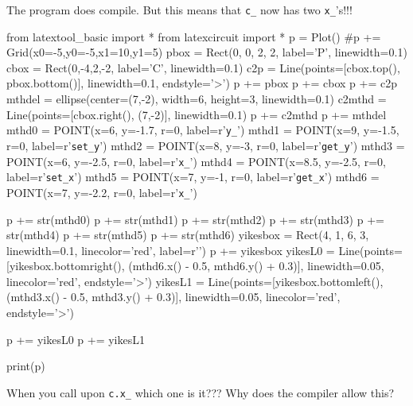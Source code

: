 The program does compile. But this means that \verb!c_! now has two
\verb!x_!'s!!!
\begin{python}
from latextool_basic import *
from latexcircuit import *
p = Plot()
#p += Grid(x0=-5,y0=-5,x1=10,y1=5)
pbox = Rect(0, 0, 2, 2, label='P', linewidth=0.1)
cbox = Rect(0,-4,2,-2, label='C', linewidth=0.1)
c2p = Line(points=[cbox.top(), pbox.bottom()], linewidth=0.1, endstyle='>')
p += pbox
p += cbox
p += c2p
mthdel = ellipse(center=(7,-2), width=6, height=3, linewidth=0.1)
c2mthd = Line(points=[cbox.right(), (7,-2)], linewidth=0.1)
p += c2mthd
p += mthdel
mthd0 = POINT(x=6, y=-1.7, r=0, label=r'\verb!y_!')
mthd1 = POINT(x=9, y=-1.5, r=0, label=r'\verb!set_y!')
mthd2 = POINT(x=8, y=-3, r=0, label=r'\verb!get_y!')
mthd3 = POINT(x=6, y=-2.5, r=0, label=r'\verb!x_!')
mthd4 = POINT(x=8.5, y=-2.5, r=0, label=r'\verb!set_x!')
mthd5 = POINT(x=7, y=-1, r=0, label=r'\verb!get_x!')
mthd6 = POINT(x=7, y=-2.2, r=0, label=r'\verb!x_!')

p += str(mthd0)
p += str(mthd1)
p += str(mthd2)
p += str(mthd3)
p += str(mthd4)
p += str(mthd5)
p += str(mthd6)
yikesbox = Rect(4, 1, 6, 3, linewidth=0.1, linecolor='red', label=r'\textbf{}')
p += yikesbox
yikesL0 = Line(points=[yikesbox.bottomright(), (mthd6.x() - 0.5, mthd6.y() + 0.3)], linewidth=0.05, linecolor='red', endstyle='>')
yikesL1 = Line(points=[yikesbox.bottomleft(), (mthd3.x() - 0.5, mthd3.y() + 0.3)], linewidth=0.05, linecolor='red', endstyle='>')

p += yikesL0
p += yikesL1

print(p)
\end{python}
When you call upon \verb!c.x_! which one is it??? Why does the compiler
allow this?

